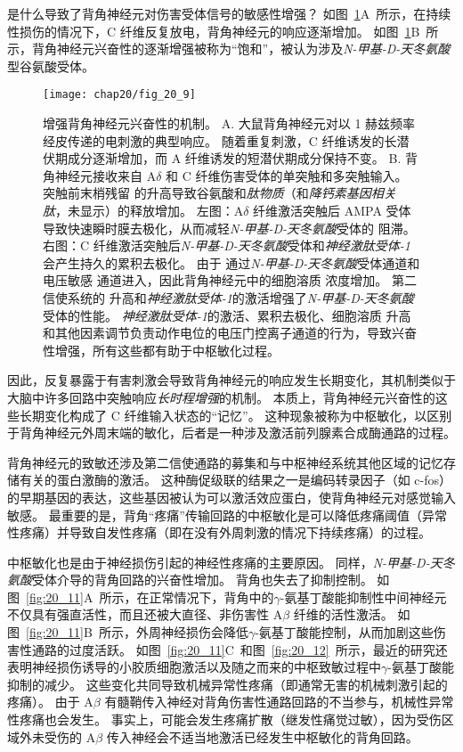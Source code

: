 是什么导致了背角神经元对伤害受体信号的敏感性增强？
如图~\ref{fig:20_10}A~所示，在持续性损伤的情况下，C 纤维反复放电，背角神经元的响应逐渐增加。
如图~\ref{fig:20_10}B~所示，背角神经元兴奋性的逐渐增强被称为“饱和”，被认为涉及\textit{N-甲基-D-天冬氨酸}型谷氨酸受体。


\begin{figure}[htbp]
	\centering
	\texttt{[image: chap20/fig\_20\_9]}
	\caption{增强背角神经元兴奋性的机制。
		A. 大鼠背角神经元对以 1 赫兹频率经皮传递的电刺激的典型响应。
		随着重复刺激，C 纤维诱发的长潜伏期成分逐渐增加，而 A 纤维诱发的短潜伏期成分保持不变。
		B. 背角神经元接收来自 A$\delta$ 和 C 纤维伤害受体的单突触和多突触输入。
		突触前末梢残留  的升高导致谷氨酸和\textit{肽物质}（和\textit{降钙素基因相关肽}，未显示）的释放增加。
		左图：A$\delta$ 纤维激活突触后 AMPA 受体导致快速瞬时膜去极化，从而减轻\textit{N-甲基-D-天冬氨酸}受体的  阻滞。
		右图：C 纤维激活突触后\textit{N-甲基-D-天冬氨酸}受体和\textit{神经激肽受体-1}会产生持久的累积去极化。
		由于  通过\textit{N-甲基-D-天冬氨酸}受体通道和电压敏感  通道进入，因此背角神经元中的细胞溶质  浓度增加。
		第二信使系统的  升高和\textit{神经激肽受体-1}的激活增强了\textit{N-甲基-D-天冬氨酸}受体的性能。
		\textit{神经激肽受体-1}的激活、累积去极化、细胞溶质  升高和其他因素调节负责动作电位的电压门控离子通道的行为，导致兴奋性增强，所有这些都有助于中枢敏化过程。}
	\label{fig:20_10}
\end{figure}


因此，反复暴露于有害刺激会导致背角神经元的响应发生长期变化，其机制类似于大脑中许多回路中突触响应\textit{长时程增强}的机制。
本质上，背角神经元兴奋性的这些长期变化构成了 C 纤维输入状态的“记忆”。
这种现象被称为中枢敏化，以区别于背角神经元外周末端的敏化，后者是一种涉及激活前列腺素合成酶通路的过程。


背角神经元的致敏还涉及第二信使通路的募集和与中枢神经系统其他区域的记忆存储有关的蛋白激酶的激活。
这种酶促级联的结果之一是编码转录因子（如 c-fos）的早期基因的表达，这些基因被认为可以激活效应蛋白，使背角神经元对感觉输入敏感。
最重要的是，背角“疼痛”传输回路的中枢敏化是可以降低疼痛阈值（异常性疼痛）并导致自发性疼痛（即在没有外周刺激的情况下持续疼痛）的过程。


中枢敏化也是由于神经损伤引起的神经性疼痛的主要原因。
同样，\textit{N-甲基-D-天冬氨酸}受体介导的背角回路的兴奋性增加。
背角也失去了抑制控制。
如图~\ref{fig:20_11}A~所示，在正常情况下，背角中的$\gamma$-氨基丁酸能抑制性中间神经元不仅具有强直活性，而且还被大直径、非伤害性 A$ \beta $ 纤维的活性激活。
如图~\ref{fig:20_11}B~所示，外周神经损伤会降低$\gamma$-氨基丁酸能控制，从而加剧这些伤害性通路的过度活跃。
如图~\ref{fig:20_11}C~和图~\ref{fig:20_12}~所示，最近的研究还表明神经损伤诱导的小胶质细胞激活以及随之而来的中枢致敏过程中$\gamma$-氨基丁酸能抑制的减少。
这些变化共同导致机械异常性疼痛（即通常无害的机械刺激引起的疼痛）。
由于 A$ \beta $ 有髓鞘传入神经对背角伤害性通路回路的不当参与，机械性异常性疼痛也会发生。
事实上，可能会发生疼痛扩散（继发性痛觉过敏），因为受伤区域外未受伤的 A$ \beta $ 传入神经会不适当地激活已经发生中枢敏化的背角回路。


